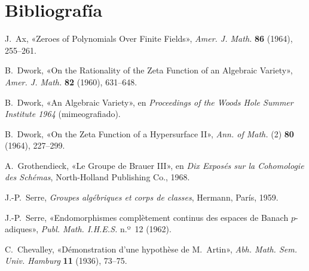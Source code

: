 \pageoriginale

\section*{Bibliografía}

\begin{enumerate}[label={\textup{[\arabic*]}},leftmargin=2.4em]
\item J.~Ax, «Zeroes of Polynomials Over Finite Fields»,
  \emph{Amer. J. Math.} \textbf{86} (1964), 255--261.
\item B.~Dwork, «On the Rationality of the Zeta Function of an Algebraic
  Variety», \emph{Amer. J. Math.} \textbf{82} (1960), 631--648.
\item B.~Dwork, «An Algebraic Variety», en \emph{Proceedings of the
  Woods Hole Summer Institute 1964} (mimeografiado).
\item B.~Dwork, «On the Zeta Function of a Hypersurface II»,
  \emph{Ann. of Math.} (2) \textbf{80} (1964), 227--299.
\item A.~Grothendieck, «Le Groupe de Brauer III», en
  \emph{Dix Exposés sur la Cohomologie des Schémas},
  North-Holland Publishing Co., 1968.
\item J.-P.~Serre, \emph{Groupes algébriques et corps de classes},
  Hermann, París, 1959.
\item J.-P.~Serre, «Endomorphismes complètement continus des espaces de
  Banach $p$-adiques», \emph{Publ. Math. I.H.E.S.} n.º~12 (1962).
\item C.~Chevalley, «Démonstration d'une hypothèse de M.~Artin»,
  \emph{Abh. Math. Sem. Univ. Hamburg} \textbf{11} (1936), 73--75.
\end{enumerate}
